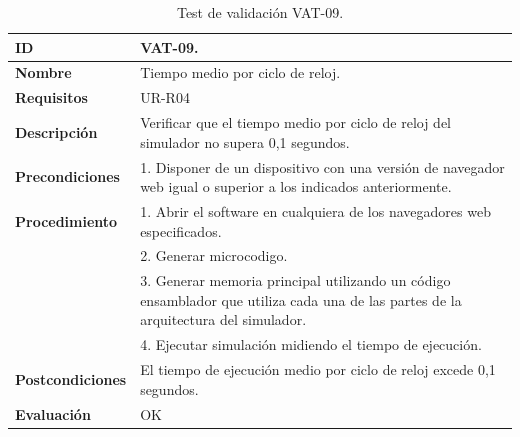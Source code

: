\begin{center}
\begin{table}[htbp]
\centering
\caption{Test de validación VAT-09.}
\begin{tabular}{@{}p{2.5cm} p{13cm}@{}} 
\toprule
\textbf{ID} 					& VAT-09. \\
\midrule
\textbf{Nombre} 				& Tiempo medio por ciclo de reloj. \\
\midrule
\textbf{Requisitos} 		& UR-R04\\
\midrule
\textbf{Descripción} 		& Verificar que el tiempo medio por ciclo de reloj del simulador no supera 0,1 segundos. \\
\midrule
\textbf{Precondiciones}		& 1. Disponer de un dispositivo con una versión de navegador web igual o superior a los indicados anteriormente. \\
\midrule
\textbf{Procedimiento}			& 1. Abrir el \gls{software} en cualquiera de los navegadores web especificados. \\
							& 2. Generar \gls{microcodigo}.\\
							& 3. Generar memoria principal utilizando un código \gls{ensamblador} que utiliza cada una de las partes de la arquitectura del simulador.\\
							& 4. Ejecutar simulación midiendo el tiempo de ejecución.\\
\midrule
\textbf{Postcondiciones} 		&  El tiempo de ejecución medio por ciclo de reloj excede 0,1 segundos.\\
\midrule
\textbf{Evaluación} 			& OK \\
\bottomrule
\end{tabular}
\label{tab:vat-09}
\end{table}
\end{center}

